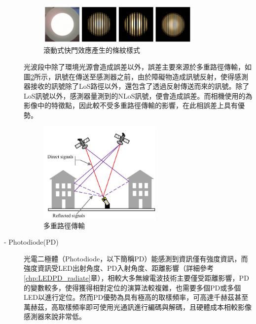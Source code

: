 \begin{description}
                    \begin{figure}[h]
                        \centering
                        \includegraphics[width=8cm]{ch2pic/rolling_shutter_case.png}
                        \caption{滾動式快門效應產生的條紋樣式\cite{pic:rolling_shutter_case}}
                        \label{pic:rolling_shutter_case}
                    \end{figure}

                    \qquad
                    光波段中除了環境光源會造成誤差以外，誤差主要來源於多重路徑傳輸，如圖\ref{pic:multipath}所示，訊號在傳送至感測器之前，由於障礙物造成訊號反射，使得感測器接收的訊號除了LoS路徑以外，還包含了透過反射傳送而來的訊號。除了LoS訊號以外，感測器量測到的NLoS訊號，便會造成誤差。而相機使用的為影像中的特徵點，因此較不受多重路徑傳輸的影響，在此相誤差上具有優勢。

                    \begin{figure}[h]
                        \centering
                        \includegraphics[width=6cm]{ch2pic/multipath.png}
                        \caption{多重路徑傳輸\cite{pic:multipath}}
                        \label{pic:multipath}
                    \end{figure}

                    \item[- Photodiode(PD)]\hfill
                    
                    \qquad
                    光電二極體（Photodiode，以下簡稱PD）能感測到資訊僅有強度資訊，而強度資訊受LED出射角度、PD入射角度、距離影響（詳細參考\ref{chp:LEDPD_radiate}章），相較大多無線電波技術主要僅受距離影響，PD的變數較多，使得獲得相對定位的演算法較複雜，也需要多個PD或多個LED以進行定位。然而PD優勢為具有極高的取樣頻率，可高達千赫茲甚至萬赫茲，高取樣頻率即可使用光通訊進行編碼與解碼，且硬體成本相較影像感測器來說非常低。


\end{description}
